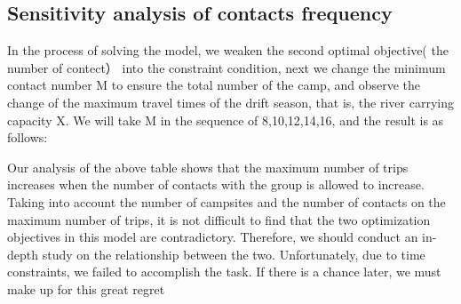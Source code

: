 \subsection{Sensitivity analysis of contacts frequency}
\noindent
In the process of solving the model, we weaken the second optimal objective( the number of contect） into the constraint condition, next we change the minimum contact number M to ensure the total number of the camp, and observe the change of the maximum travel times of the drift season, that is, the river carrying capacity X. We will take M in the sequence of 8,10,12,14,16, and the result is as follows:
\begin{table}[htbp]
	\centering
	\caption{\label{tab:Symbols}the sequence of 8,10,12,14,16, and the results}
\end{table}
\par Our analysis of the above table shows that the maximum number of trips increases when the number of contacts with the group is allowed to increase. Taking into account the number of campsites and the number of contacts on the maximum number of trips, it is not difficult to find that the two optimization objectives in this model are contradictory. Therefore, we should conduct an in-depth study on the relationship between the two. Unfortunately, due to time constraints, we failed to accomplish the task. If there is a chance later, we must make up for this great regret